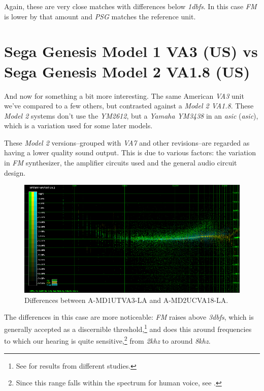 \documentclass[10pt,a4paper]{report}
\newcommand{\define}[1]{\textit{\acrlong{#1}} (\textit{\acrshort{#1}})}
\newcommand{\khz}[1]{\textit{\mbox{#1\acrshort{khz}}}}
\newcommand{\db}[1]{\textit{\mbox{#1\acrshort{dbfs}}}}
\begin{document}
Again, these are very close matches with differences below \db{1}. In this case \textit{FM} is lower by that amount and \textit{PSG} matches the reference unit.

\section{Sega Genesis Model 1 VA3 (US) vs\\ Sega Genesis Model 2 VA1.8 (US)}
\label{model2}

And now for something a bit more interesting. The same American \textit{VA3} unit we've compared to a few others, but contrasted against a \textit{Model 2 VA1.8}. These \textit{Model 2} systems don't use the \textit{YM2612}, but a \textit{Yamaha YM3438} in an \define{asic}, which is a variation used for some later models.

These \textit{Model 2} versions--grouped with \textit{VA7} and other revisions--are regarded as having a lower quality sound output. This is due to various factors: the variation in \textit{FM} synthesizer, the amplifier circuits used and the general audio circuit design.

\begin{figure}[H]
	\centering
	\includegraphics[width=1.0\linewidth]{images/results/5-1-A-MD1UTVA3-LA_vs_A-MD2UCVA18-LA.png}
	\caption[A-MD1UTVA3-LA vs A-MD2UCVA18-LA]{Differences between A-MD1UTVA3-LA and A-MD2UCVA18-LA.}
	\label{fig:A-MD1UTVA3-LA_vs_A-MD2UCVA18-LA}
\end{figure}

The differences in this case are more noticeable: \textit{FM} raises above \db{3}, which is generally accepted as a discernible threshold,\footnote{See \cite{dbdiff} for results from different studies.} and does this around frequencies to which our hearing is quite sensitive,\footnote{Since this range falls within the spectrum for human voice, see \cite{humanvoice}.} from \khz{2} to around \khz{8}.
\end{document}
